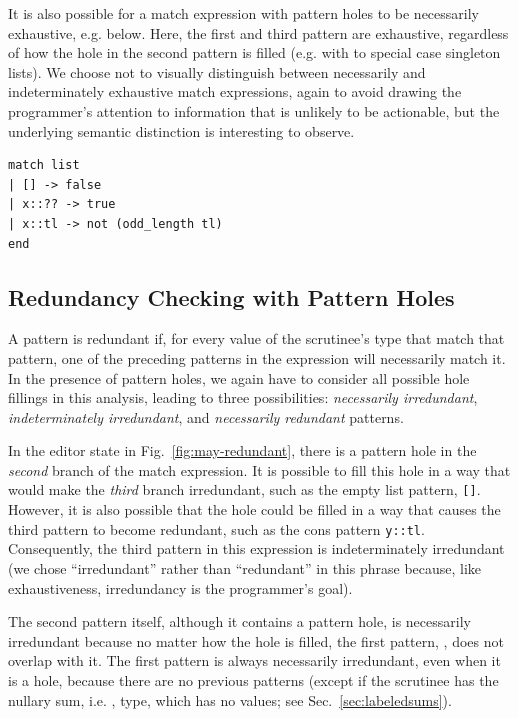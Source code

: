 It is also possible for a match expression with pattern holes to be necessarily exhaustive, e.g. below. Here, the first and third pattern are
exhaustive, regardless of how the hole in the second pattern is filled (e.g. with \li{[]} to special case singleton lists). We choose not to visually distinguish between necessarily and indeterminately exhaustive match expressions, again to avoid drawing
the programmer's attention to information that is unlikely to be actionable, but the
underlying semantic distinction is interesting to observe.
\begin{lstlisting}
match list
| [] -> false
| x::?? -> true
| x::tl -> not (odd_length tl)
end
\end{lstlisting}

\subsection{Redundancy Checking with Pattern Holes}
\label{sec:hazel-redundancy}
A pattern is redundant if, for every value of the scrutinee's type that match that pattern, one of the preceding patterns in the  expression will necessarily 
match it. In the presence of pattern holes, we again have to consider all possible hole fillings in this analysis, leading to three possibilities: \emph{necessarily irredundant}, \emph{indeterminately irredundant}, and \emph{necessarily redundant} patterns.

In the editor state in Fig.~\ref{fig:may-redundant}, there is a pattern hole in the \emph{second} branch of the match expression. It is possible to fill this hole in a way that would make the \emph{third} branch irredundant, such as the empty list pattern, \texttt{[]}. 
However, it is also possible that the hole could be filled in a way that causes the third pattern to become redundant, such as the cons pattern \texttt{y::tl}. Consequently, the third pattern in this  expression is indeterminately irredundant (we chose ``irredundant'' rather than ``redundant'' in this phrase because, like exhaustiveness, irredundancy is the programmer's goal).

The second pattern itself, although it contains a pattern hole, is necessarily irredundant because no matter how the hole is filled, the first pattern, \li{[]}, does not overlap with it. The first pattern is always necessarily irredundant, even when it is a hole, because
there are no previous patterns (except if the scrutinee has the nullary sum, i.e. , type, which has no values; see Sec.~\ref{sec:labeledsums}).

